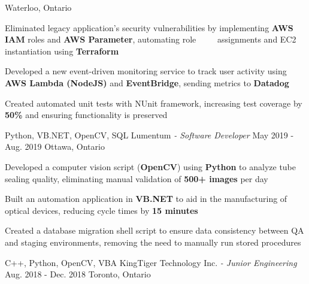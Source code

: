 \begin{siderules}
\begin{cventries}
    {Waterloo, Ontario}
    {
      \begin{cvitems}
        \item {Eliminated legacy application’s security vulnerabilities by implementing \textbf{AWS IAM} roles and \textbf{AWS Parameter}, automating role $\>$ $\>$ $\>$ $\>$ assignments and EC2 instantiation using \textbf{Terraform}}
        \item {Developed a new event-driven monitoring service to track user activity using \textbf{AWS Lambda (NodeJS)} and \textbf{EventBridge}, sending metrics to \textbf{Datadog}}
        \item {Created automated unit tests with NUnit framework, increasing test coverage by \textbf{50\%} and ensuring functionality is preserved}
      \end{cvitems}
    }
    \cventry
      {Python, VB.NET, OpenCV, SQL}
      {Lumentum\hspace{0.15em} \bodyfontlight\itshape{- Software Developer}}
      {May 2019 - Aug. 2019}
      {Ottawa, Ontario}
      {
        \begin{cvitems}
          \item {Developed a computer vision script (\textbf{OpenCV}) using \textbf{Python} to analyze tube sealing quality, eliminating manual validation of \textbf{500+ images} per day}
          \item {Built an automation application in \textbf{VB.NET} to aid in the manufacturing of optical devices, reducing cycle times by \textbf{15 minutes}}
          \item {Created a database migration shell script to ensure data consistency between QA and staging environments, removing the need to manually run stored procedures}
        \end{cvitems}
      }
    \cventry
      {C++, Python, OpenCV, VBA}
      {KingTiger Technology Inc.\hspace{0.15em} \bodyfontlight\itshape{- Junior Engineering}}
      {Aug. 2018 - Dec. 2018}
      {Toronto, Ontario}
      {
        \begin{cvitems}

\end{cvitems}}
\end{cventries}
\end{siderules}
